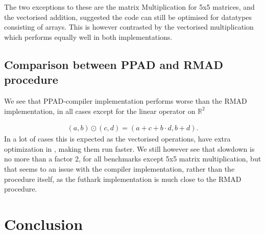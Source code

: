 \documentclass{article}
\begin{document}
The two exceptions to these are the matrix Multiplication for 5x5 matrices,
and the vectorised addition,
suggested the code can still be optimised for datatypes consisting of
arrays.
This is however contrasted by the vectorised multiplication which performs
equally well in both implementations.
\subsection{Comparison between PPAD and RMAD procedure}
We see that PPAD-compiler implementation performs worse than the RMAD
implementation, in all cases except for the linear operator on \(\mathbb{R}^{2}\)

\begin{align*}
	(a,b) \odot (c,d) = (a + c + b \cdot d, b + d).
\end{align*}
In a lot of cases this is expected as the vectorised operations, have extra
optimization in \cite{Futhark}, making them run faster.
We still however see that slowdown is no more than a factor 2, for all
benchmarks except 5x5 matrix multiplication, but that seems to an issue with
the compiler implementation, rather than the procedure itself, as the
futhark implementation is much close to the RMAD procedure.
\section{Conclusion}

\printbibliography
\end{document}
